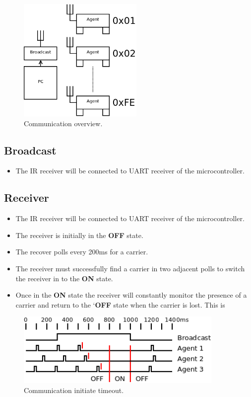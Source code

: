 \documentclass[a4paper]{article}
\begin{document}
\begin{figure}[h]
   \centering
   \label{fig_communications}
   \includegraphics[width=6cm,keepaspectratio]{communications/communications.png} 
   \caption{Communication overview.}
\end{figure}

   \subsection{Broadcast}
      \begin{itemize}
         \item The IR receiver will be connected to UART receiver of the microcontroller.  
      \end{itemize}

 
   
   \subsection{Receiver}
      \begin{itemize}
         \item The IR receiver will be connected to UART receiver of the microcontroller. 
         \item The receiver is initially in the \textbf{OFF} state. 
         \item The recover polls every 200ms for a carrier.
         \item The receiver must successfully find a carrier in two adjacent polls to switch the 
               receiver in to the \textbf{ON} state.
         \item Once in the \textbf{ON} state the receiver will constantly monitor the presence 
               of a carrier and return to the `\textbf{OFF} state when the carrier is lost. 
               This is 
      \end{itemize}

      \begin{figure}[h]
         \centering
         \label{fig_communications_time}
         \includegraphics[width=10cm,keepaspectratio]{communications/communications_time.png} 
         \caption{Communication initiate timeout.}
      \end{figure}
\end{document}
